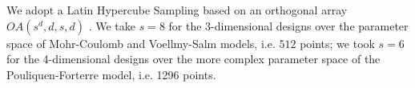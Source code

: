 \documentclass{article}
\begin{document}

We adopt a Latin Hypercube Sampling based on an orthogonal array $OA(s^d,d,s,d)$ \citep{Patra2018}. We take $s=8$ for the 3-dimensional designs over the parameter space of Mohr-Coulomb and Voellmy-Salm models, i.e. $512$ points; we took $s=6$ for the 4-dimensional designs over the more complex parameter space of the Pouliquen-Forterre model, i.e. 1296 points.
\end{document}
